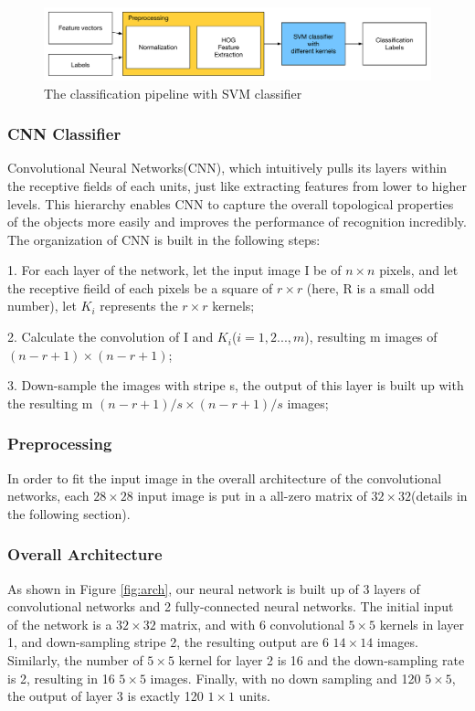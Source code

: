 \documentclass[12pt]{article}
\begin{document}
\begin{figure}[tbp]
	\centering
	\includegraphics[width =\textwidth]{pipeline-svm}		
	\caption{The classification pipeline with SVM classifier}
	\label{fig:pipeline-svm}
\end{figure}
 
\subsubsection{CNN Classifier}
Convolutional Neural Networks(CNN)\cite{krizhevsky2012imagenet}, which intuitively pulls its layers within the receptive fields of each units, just like extracting features from lower to higher levels. This hierarchy enables CNN to capture the overall topological properties of the objects more easily and improves the performance of recognition incredibly\cite{lecun1998gradient}.
The organization of CNN is built in the following steps: 

1. For each layer of the network, let the input image I be of $n \times n$ pixels, and let the receptive fieild of each pixels be a square of $r\times r$ (here, R is a small odd number), let $K_i$ represents the $r\times r$ kernels;

2. Calculate the convolution of I and $K_i$($i = 1,2...,m$), resulting m images of $(n-r+1) \times (n-r+1)$;

3. Down-sample the images with stripe s, the output of this layer is built up with the resulting m $(n-r+1)/s \times (n-r+1)/s$ images;
\subsubsection{Preprocessing}

In order to fit the input image in the overall architecture of the convolutional networks, each $28\times 28$ input image is put in a all-zero matrix of $32\times 32$(details in the following section).

\subsubsection{Overall Architecture}

As shown in Figure \ref{fig:arch}, our neural network is built up of 3 layers of convolutional networks and 2 fully-connected neural networks. The initial input of the network is a $32\times 32$ matrix, and with 6 convolutional $5\times 5$ kernels in layer 1, and down-sampling stripe 2, the resulting output are 6 $14\times 14$ images. Similarly, the number of $5\times 5$ kernel for layer 2 is 16 and the down-sampling rate is 2, resulting in 16 $5\times 5$ images. Finally, with no down sampling and 120 $5\times 5$, the output of layer 3 is exactly 120 $1\times 1$ units.
\end{document}

